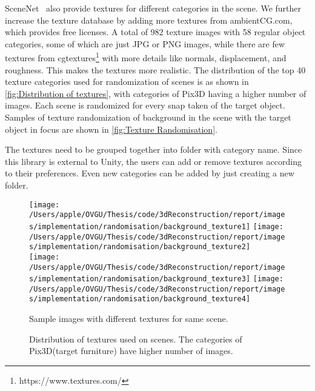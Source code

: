 SceneNet~\cite{McCormac2017} also provide textures for different categories in the scene.
We further increase the texture database by adding more textures from ambientCG.com, which provides free licenses.
A total of 982 texture images with 58 regular object categories, some of which are just JPG or PNG images, while there are few textures from cgtextures\footnote{https://www.textures.com/} with more details like normals, displacement, and roughness.
This makes the textures more realistic.
The distribution of the top 40 texture categories used for randomization of scenes is as shown in \autoref{fig:Distribution of textures}, with categories of Pix3D
having a higher number of images.
Each scene is randomized for every snap taken of the target object.
Samples of texture randomization of background in the scene with the target object in focus are shown in \autoref{fig:Texture Randomisation}.

The textures need to be grouped together into folder with category name.
Since this library is external to Unity, the users can add or remove textures according to their preferences.
Even new categories can be added by just creating a new folder.

\begin{figure}[!ht]
    \centering
    \texttt{[image: /Users/apple/OVGU/Thesis/code/3dReconstruction/report/images/implementation/randomisation/background\_texture1]}
    \texttt{[image: /Users/apple/OVGU/Thesis/code/3dReconstruction/report/images/implementation/randomisation/background\_texture2]}\\
    \vspace{0.1cm}
    \texttt{[image: /Users/apple/OVGU/Thesis/code/3dReconstruction/report/images/implementation/randomisation/background\_texture3]}
    \texttt{[image: /Users/apple/OVGU/Thesis/code/3dReconstruction/report/images/implementation/randomisation/background\_texture4]}\\
    \caption[Samples for Different Textures.]{Sample images with different textures for same scene.}
    \label{fig:Texture Randomisation}
\end{figure}

\begin{figure}[!ht]
    \centering
    \resizebox{\textwidth}{11.5cm}{}
    \caption[Distribution of Textures.]{Distribution of textures used on scenes. The categories of Pix3D(target furniture) have higher number of images.}
    \label{fig:Distribution of textures}
\end{figure}

